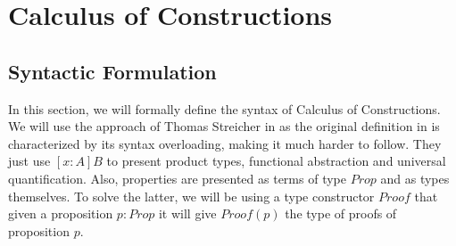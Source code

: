 \chapter{Calculus of Constructions}

\section{Syntactic Formulation}

In this section, we will formally define the syntax of Calculus of Constructions.
We will use the approach of Thomas Streicher in \cite{streicher} as the original 
definition in \cite{coquand1988} is characterized by its syntax overloading, 
making it much harder to follow.
They just use $[x: A]B$ to present product types, functional abstraction and 
universal quantification. Also, properties are presented as terms of type $Prop$
and as types themselves. To solve the latter, we will be using a type constructor
$Proof$ that given a proposition $p : Prop$ it will give $Proof(p)$ the type of 
proofs of proposition $p$.


